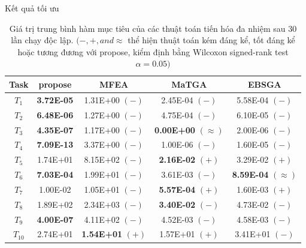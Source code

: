     \begin{frame}{Kết quả tối ưu}
        \begin{table}[H]
            \begin{tabular}{@{}ccccc@{}}
                \toprule
                \textbf{Task} & \gls{propose} & MFEA & MaTGA & EBSGA \\ \midrule
                $T_1$ & \textbf{3.72E-05}   & 1.31E+00 $(-)$          & 2.45E-04          $(-)$ & 5.58E-04 $(-)$ \\
                $T_2$ & \textbf{6.48E-06}   & 1.27E+00 $(-)$          & 4.75E-04          $(-)$ & 6.10E-05 $(-)$ \\
                $T_3$ & \textbf{4.35E-07}   & 1.17E+00 $(-)$          & \textbf{0.00E+00} $(\approx)$ & 2.00E-06 $(-)$ \\
                $T_4$ & \textbf{7.09E-13}   & 3.37E+00 $(-)$          & 1.00E-06          $(-)$ & 1.60E-05 $(-)$ \\
                $T_5$ & 1.74E+01            & 8.15E+02 $(-)$          & \textbf{2.16E-02} $(+)$ & 3.29E-02 $(+)$ \\
                $T_6$ & \textbf{7.03E-04}   & 1.99E+01 $(-)$          & 3.61E-03          $(-)$ & \textbf{8.59E-04} $(\approx)$ \\
                $T_7$ & 1.00E-02            & 1.05E+01 $(-)$          & \textbf{5.57E-04} $(+)$ & 1.60E-03 $(+)$ \\
                $T_8$ & 1.89E+02            & 2.34E+03 $(-)$          & \textbf{3.40E-02} $(-)$ & 4.73E-02 $(-)$ \\
                $T_9$ & \textbf{4.00E-07}   & 4.11E+02 $(-)$          & 4.52E-03          $(-)$ & 4.58E-03 $(-)$ \\
                $T_{10}$ & 2.74E+01            & \textbf{1.54E+01} $(+)$ & 1.57E+01          $(+)$ & 3.41E+01 $(-)$ \\
                \bottomrule
            \end{tabular}
            \caption{Giá trị trung bình hàm mục tiêu của các thuật toán tiến hóa đa nhiệm sau 30 lần chạy độc lập. $(-, +, and \approx$ thể hiện thuật toán kém đáng kể, tốt đáng kể hoặc tương đương với \gls{propose}, kiểm định bằng Wilcoxon signed-rank test $\alpha=0.05)$}
            \label{tab:experiment:last10}
        \end{table}
    \end{frame}
